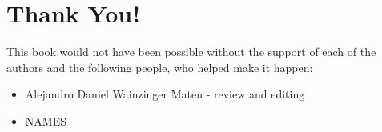 \section*{Thank You!}

This book would not have been possible without the support of each of the
authors and the following people, who helped make it happen:
\begin{itemize}
 \item Alejandro Daniel Wainzinger Mateu - review and editing
 \item NAMES
\end{itemize}

\newpage
